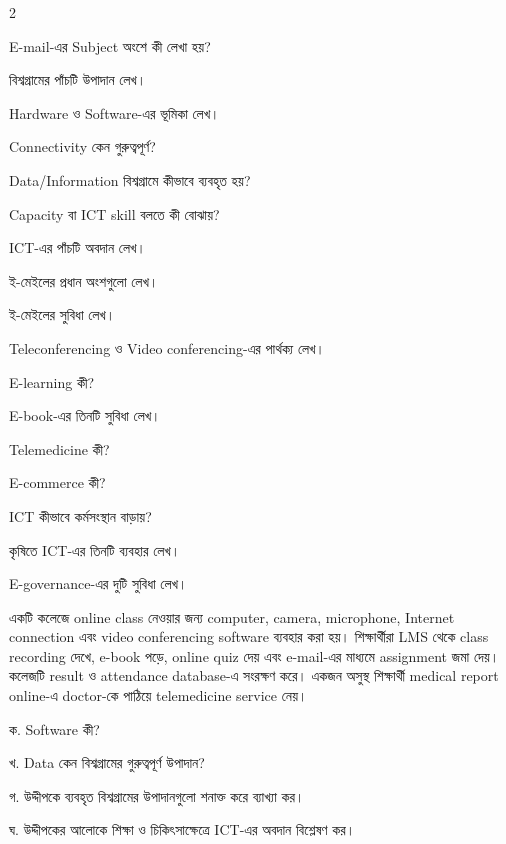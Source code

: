 \begin{topicbody}
\begin{multicols}{2}
\begin{compactenum}
\item \begin{minipage}[t]{\linewidth}E-mail-এর Subject অংশে কী লেখা হয়?\par {}\par\end{minipage}
\end{compactenum}\end{multicols}

\begin{compactenum}
\item বিশ্বগ্রামের পাঁচটি উপাদান লেখ।
\item Hardware ও Software-এর ভূমিকা লেখ।
\item Connectivity কেন গুরুত্বপূর্ণ?
\item Data/Information বিশ্বগ্রামে কীভাবে ব্যবহৃত হয়?
\item Capacity বা ICT skill বলতে কী বোঝায়?
\item ICT-এর পাঁচটি অবদান লেখ।
\item ই-মেইলের প্রধান অংশগুলো লেখ।
\item ই-মেইলের সুবিধা লেখ।
\item Teleconferencing ও Video conferencing-এর পার্থক্য লেখ।
\item E-learning কী?
\item E-book-এর তিনটি সুবিধা লেখ।
\item Telemedicine কী?
\item E-commerce কী?
\item ICT কীভাবে কর্মসংস্থান বাড়ায়?
\item কৃষিতে ICT-এর তিনটি ব্যবহার লেখ।
\item E-governance-এর দুটি সুবিধা লেখ।
\end{compactenum}

একটি কলেজে online class নেওয়ার জন্য computer, camera, microphone, Internet connection এবং video conferencing software ব্যবহার করা হয়। শিক্ষার্থীরা LMS থেকে class recording দেখে, e-book পড়ে, online quiz দেয় এবং e-mail-এর মাধ্যমে assignment জমা দেয়। কলেজটি result ও attendance database-এ সংরক্ষণ করে। একজন অসুস্থ শিক্ষার্থী medical report online-এ doctor-কে পাঠিয়ে telemedicine service নেয়।

\begin{compactenum}
\item ক. Software কী?
\item খ. Data কেন বিশ্বগ্রামের গুরুত্বপূর্ণ উপাদান?
\item গ. উদ্দীপকে ব্যবহৃত বিশ্বগ্রামের উপাদানগুলো শনাক্ত করে ব্যাখ্যা কর।
\item ঘ. উদ্দীপকের আলোকে শিক্ষা ও চিকিৎসাক্ষেত্রে ICT-এর অবদান বিশ্লেষণ কর।
\end{compactenum}


\end{topicbody}

